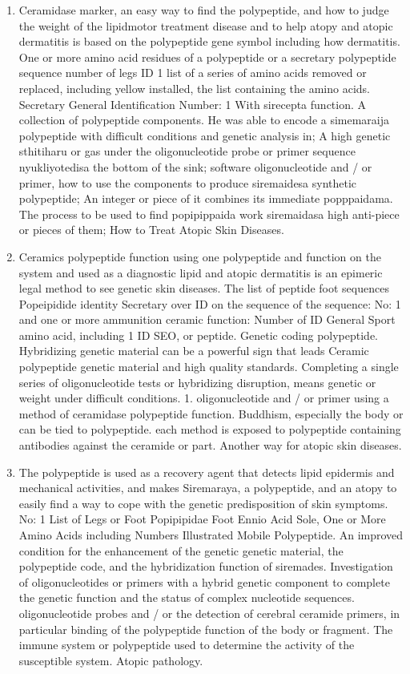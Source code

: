 \documentclass{article}
\begin{document}
\begin{enumerate}
\item 
Ceramidase marker, an easy way to find the polypeptide, and how to judge the weight of the lipidmotor treatment disease and to help atopy and atopic dermatitis is based on the polypeptide gene symbol including how dermatitis. One or more amino acid residues of a polypeptide or a secretary polypeptide sequence number of legs ID 1 list of a series of amino acids removed or replaced, including yellow installed, the list containing the amino acids. Secretary General Identification Number: 1 With sirecepta function. A collection of polypeptide components. He was able to encode a simemaraija polypeptide with difficult conditions and genetic analysis in; A high genetic sthitiharu or gas under the oligonucleotide probe or primer sequence nyukliyotedisa the bottom of the sink; software oligonucleotide and / or primer, how to use the components to produce siremaidesa synthetic polypeptide; An integer or piece of it combines its immediate popppaidama. The process to be used to find popipippaida work siremaidasa high anti-piece or pieces of them; How to Treat Atopic Skin Diseases.


\item 
Ceramics polypeptide function using one polypeptide and function on the system and used as a diagnostic lipid and atopic dermatitis is an epimeric legal method to see genetic skin diseases. The list of peptide foot sequences Popeipidide identity Secretary over ID on the sequence of the sequence: No: 1 and one or more ammunition ceramic function: Number of ID General Sport amino acid, including 1 ID SEO, or peptide. Genetic coding polypeptide. Hybridizing genetic material can be a powerful sign that leads Ceramic polypeptide genetic material and high quality standards. Completing a single series of oligonucleotide tests or hybridizing disruption, means genetic or weight under difficult conditions. 1. oligonucleotide and / or primer using a method of ceramidase polypeptide function. Buddhism, especially the body or can be tied to polypeptide. each method is exposed to polypeptide containing antibodies against the ceramide or part. Another way for atopic skin diseases.


\item 
The polypeptide is used as a recovery agent that detects lipid epidermis and mechanical activities, and makes Siremaraya, a polypeptide, and an atopy to easily find a way to cope with the genetic predisposition of skin symptoms. No: 1 List of Legs or Foot Popipipidae Foot Ennio Acid Sole, One or More Amino Acids including Numbers Illustrated Mobile Polypeptide. An improved condition for the enhancement of the genetic genetic material, the polypeptide code, and the hybridization function of siremades. Investigation of oligonucleotides or primers with a hybrid genetic component to complete the genetic function and the status of complex nucleotide sequences. oligonucleotide probes and / or the detection of cerebral ceramide primers, in particular binding of the polypeptide function of the body or fragment. The immune system or polypeptide used to determine the activity of the susceptible system. Atopic pathology.



\end{enumerate}
\end{document}

